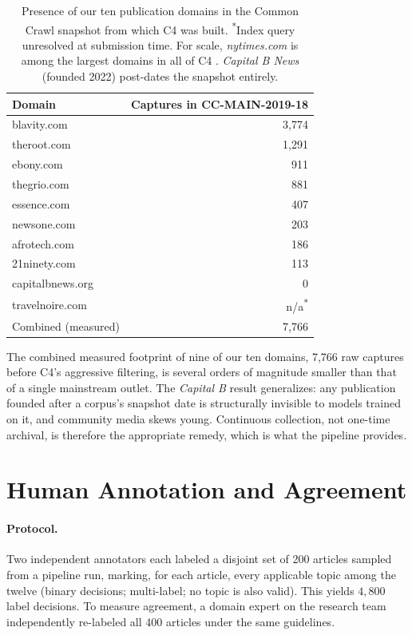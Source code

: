 \documentclass[letterpaper]{article}
\begin{document}
\begin{table}[t]
\centering
\small
\begin{tabular}{lr}
\toprule
Domain & Captures in CC-MAIN-2019-18 \\
\midrule
blavity.com        & 3{,}774 \\
theroot.com        & 1{,}291 \\
ebony.com          &   911 \\
thegrio.com        &   881 \\
essence.com        &   407 \\
newsone.com        &   203 \\
afrotech.com       &   186 \\
21ninety.com       &   113 \\
capitalbnews.org   &     0 \\
travelnoire.com    &   n/a\textsuperscript{*} \\
\midrule
Combined (measured) & 7{,}766 \\
\bottomrule
\end{tabular}
\caption{Presence of our ten publication domains in the Common Crawl
snapshot from which C4 was built. \textsuperscript{*}Index query
unresolved at submission time. For scale, \emph{nytimes.com} is among
the largest domains in all of C4 \citep{dodge2021}.
\emph{Capital B News} (founded 2022) post-dates the snapshot entirely.}
\label{tab:audit}
\end{table}

The combined measured footprint of nine of our ten domains, 7,766 raw
captures before C4's aggressive filtering, is several orders of magnitude
smaller than that of a single mainstream outlet. The \emph{Capital B}
result generalizes: any publication founded after a corpus's snapshot
date is structurally invisible to models trained on it, and community
media skews young. Continuous collection, not one-time archival, is
therefore the appropriate remedy, which is what the pipeline provides.

\section{Human Annotation and Agreement}
\label{sec:annotation}

\paragraph{Protocol.}
Two independent annotators each labeled a disjoint set of 200 articles
sampled from a pipeline run, marking, for each article, every applicable
topic among the twelve (binary decisions; multi-label; no topic is also
valid). This yields $4{,}800$ label decisions. To measure agreement, a
domain expert on the research team independently re-labeled all 400
articles under the same guidelines.
\end{document}
